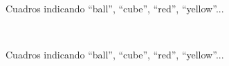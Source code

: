 



\begin{figure}[ht]
\begin{center}
\\[0pt]
\caption{Cuadros indicando ``ball'', ``cube'', ``red'', ``yellow''...}
\label{fig-modelo16}
\end{center}
\end{figure}

\begin{figure}[ht]
\begin{center}
\\[0pt]
\caption{Cuadros indicando ``ball'', ``cube'', ``red'', ``yellow''...}
\label{fig-modelo17}
\end{center}
\end{figure}

